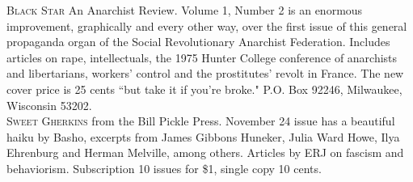 \documentclass[12pt, onecolumn, letterpaper, oneside]{book}
\begin{document}
\noindent\textsc{Black Star} An Anarchist Review. Volume 1, Number 2 is an enormous improvement, graphically and every other way, over the first issue of this general propaganda organ of the Social Revolutionary Anarchist Federation. Includes articles on rape, intellectuals, the 1975 Hunter College conference of anarchists and libertarians, workers' control and the prostitutes' revolt in France. The new cover price is 25 cents ``but take it if you're broke." P.O. Box 92246, Milwaukee, Wisconsin 53202.\\

\noindent\textsc{Sweet Gherkins} from the Bill Pickle Press. November 24 issue has a beautiful haiku by Basho, excerpts from James Gibbons Huneker, Julia Ward Howe, Ilya Ehrenburg and Herman Melville, among others. Articles by ERJ on fascism and behaviorism. Subscription 10 issues for \$1, single copy 10 cents.
\end{document}
